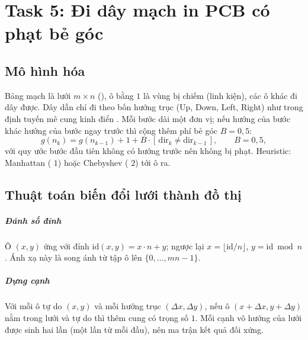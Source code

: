 \chapter{Task 5: Đi dây mạch in PCB có phạt bẻ góc}
\label{chap:task5}

\section{Mô hình hóa}
\label{sec:t5-mo-hinh}

Bảng mạch là lưới $m \times n$ (), ô bằng $1$ là vùng bị chiếm (linh kiện), các ô
khác đi dây được. Dây dẫn chỉ đi theo bốn hướng trục (Up, Down, Left, Right) như trong định tuyến
mê cung kinh điển \cite{lee1961}. Mỗi bước dài một đơn vị; nếu hướng của bước khác hướng của bước
ngay trước thì cộng thêm phí bẻ góc $B = 0{,}5$:
\begin{equation}
  g(n_{k}) = g(n_{k-1}) + 1 + B \cdot [\,\text{dir}_k \ne \text{dir}_{k-1}\,], \qquad B = 0{,}5,
  \label{eq:t5-cost}
\end{equation}
với quy ước bước đầu tiên không có hướng trước nên không bị phạt. Heuristic: Manhattan
( $1$) hoặc Chebyshev ( $2$) tới ô ra.

\section{Thuật toán biến đổi lưới thành đồ thị}
\label{sec:t5-bien-doi}

\paragraph{Đánh số đỉnh} Ô $(x, y)$ ứng với đỉnh $\text{id}(x, y) = x \cdot n + y$; ngược lại
$x = \lfloor \text{id} / n \rfloor$, $y = \text{id} \bmod n$. Ánh xạ này là song ánh từ tập ô lên
$\{0, \dots, mn - 1\}$.

\paragraph{Dựng cạnh} Với mỗi ô tự do $(x, y)$ và mỗi hướng trục $(\Delta x, \Delta y)$, nếu ô
$(x + \Delta x, y + \Delta y)$ nằm trong lưới và tự do thì thêm cung có trọng số $1$. Mỗi cạnh
vô hướng của lưới được sinh hai lần (một lần từ mỗi đầu), nên ma trận kết quả đối xứng.

